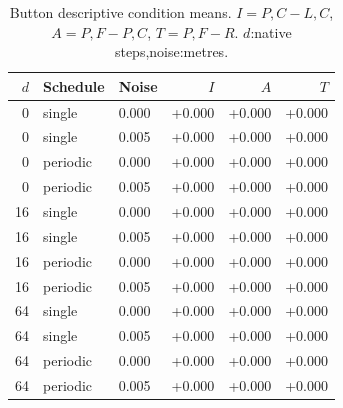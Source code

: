 \begin{table}[H]\centering\small
\caption{Button descriptive condition means. $I=P,C-L,C$, $A=P,F-P,C$, $T=P,F-R$. $d$:native steps,noise:metres.}\label{s-tab:buttonbreak}
\begin{tabular}{rllrrr}
\toprule $d$ & Schedule & Noise & $I$ & $A$ & $T$\\\midrule
0 & single & 0.000 & +0.000 & +0.000 & +0.000\\
0 & single & 0.005 & +0.000 & +0.000 & +0.000\\
0 & periodic & 0.000 & +0.000 & +0.000 & +0.000\\
0 & periodic & 0.005 & +0.000 & +0.000 & +0.000\\
16 & single & 0.000 & +0.000 & +0.000 & +0.000\\
16 & single & 0.005 & +0.000 & +0.000 & +0.000\\
16 & periodic & 0.000 & +0.000 & +0.000 & +0.000\\
16 & periodic & 0.005 & +0.000 & +0.000 & +0.000\\
64 & single & 0.000 & +0.000 & +0.000 & +0.000\\
64 & single & 0.005 & +0.000 & +0.000 & +0.000\\
64 & periodic & 0.000 & +0.000 & +0.000 & +0.000\\
64 & periodic & 0.005 & +0.000 & +0.000 & +0.000\\
\bottomrule\end{tabular}\end{table}
